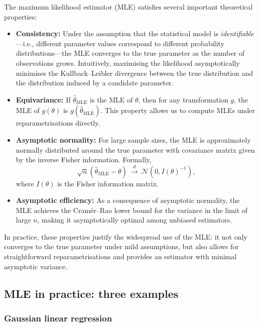 The maximum likelihood estimator (MLE) satisfies several important theoretical properties:

\begin{itemize}
    \item \textbf{Consistency:} Under the assumption that the statistical model is \emph{identifiable}—i.e., different parameter values correspond to different probability distributions—the MLE converges to the true parameter as the number of observations grows. Intuitively, maximising the likelihood asymptotically minimises the Kullback--Leibler divergence between the true distribution and the distribution induced by a candidate parameter.
    
    \item \textbf{Equivariance:} If $\hat{\theta}_{\mathrm{MLE}}$ is the MLE of $\theta$, then for any transformation $g$, the MLE of $g(\theta)$ is $g(\hat{\theta}_{\mathrm{MLE}})$. This property allows us to compute MLEs under reparametrisations directly.
    
    \item \textbf{Asymptotic normality:} For large sample sizes, the MLE is approximately normally distributed around the true parameter with covariance matrix given by the inverse Fisher information. Formally, 
    \[
        \sqrt{n}(\hat{\theta}_{\mathrm{MLE}} - \theta) \ \xrightarrow{d} \ \mathcal{N}(0, I(\theta)^{-1}),
    \]
    where $I(\theta)$ is the Fisher information matrix.
    
    \item \textbf{Asymptotic efficiency:} As a consequence of asymptotic normality, the MLE achieves the Cramér--Rao lower bound for the variance in the limit of large $n$, making it asymptotically optimal among unbiased estimators.
\end{itemize}

In practice, these properties justify the widespread use of the MLE: it not only converges to the true parameter under mild assumptions, but also allows for straightforward reparametrisations and provides an estimator with minimal asymptotic variance.



\subsection{MLE in practice: three examples}
\label{sub:MV_tres_ejemplos}

\subsubsection{Gaussian linear regression} 
\label{sub:reg_lin}


